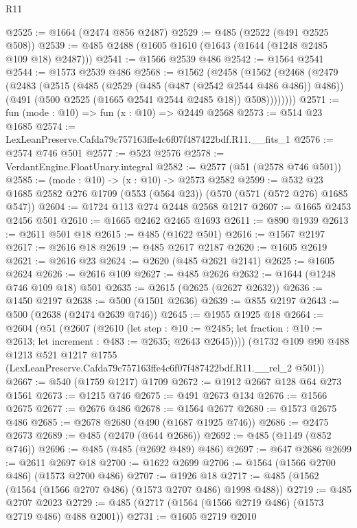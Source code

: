 \begin{lexlean}{R11}
\begin{coremodule}
@2525 := @1664 (@2474 @856 @2487)
@2529 := @485 (@2522 (@491 @2525 @508))
@2539 := @485 @2488 (@1605 @1610 (@1643 (@1644 (@1248 @2485 @109 @18) @2487)))
@2541 := @1566 @2539 @486
@2542 := @1564 @2541
@2544 := @1573 @2539 @486
@2568 := @1562
    (@2458
      (@1562
        (@2468
          (@2479
            (@2483
              (@2515
                (@485
                  (@2529 (@485 (@487 (@2542 @2544 @486 @486)) @486))
                  (@491 (@500 @2525 (@1665 @2541 @2544 @2485 @18)) @508))))))))
@2571 := fun (mode : @10) => fun (x : @10) => @2449 @2568
@2573 := @514 @23 @1685
@2574 := LexLeanPreserve.Cafda79c757163ffe4c6f07f487422bdf.R11.__fits_1
@2576 := @2574 @746 @501
@2577 := @523 @2576
@2578 := VerdantEngine.FloatUnary.integral
@2582 := @2577 (@51 (@2578 @746 @501))
@2585 := (mode : @10) -> (x : @10) -> @2573 @2582
@2599 := @532 @23 @1685 @2582 @276 @1709 (@553 (@564 @23)) (@570 (@571 (@572 @276) @1685 @547))
@2604 := @1724 @113 @274 @2448 @2568 @1217
@2607 := @1665 @2453 @2456 @501
@2610 := @1665 @2462 @2465 @1693
@2611 := @890 @1939
@2613 := @2611 @501 @18
@2615 := @485 (@1622 @501)
@2616 := @1567 @2197
@2617 := @2616 @18
@2619 := @485 @2617 @2187
@2620 := @1605 @2619
@2621 := @2616 @23
@2624 := @2620 (@485 @2621 @2141)
@2625 := @1605 @2624
@2626 := @2616 @109
@2627 := @485 @2626
@2632 := @1644 (@1248 @746 @109 @18) @501
@2635 := @2615 (@2625 (@2627 @2632))
@2636 := @1450 @2197
@2638 := @500 (@1501 @2636)
@2639 := @855 @2197
@2643 := @500 (@2638 (@2474 @2639 @746))
@2645 := @1955 @1925 @18
@2664 := @2604
    (@51
      (@2607
        (@2610
          (let step : @10 := @2485;
          let fraction : @10 := @2613; let increment : @483 := @2635; @2643 @2645))))
    (@1732
      @109
      @90
      @488
      @1213
      @521
      @1217
      @1755
      (LexLeanPreserve.Cafda79c757163ffe4c6f07f487422bdf.R11.__rel_2 @501))
@2667 := @540 (@1759 @1217) @1709
@2672 := @1912 @2667 @128 @64 @273 @1561
@2673 := @1215 @746
@2675 := @491 @2673 @134
@2676 := @1566 @2675
@2677 := @2676 @486
@2678 := @1564 @2677
@2680 := @1573 @2675 @486
@2685 := @2678 @2680 (@490 (@1687 @1925 @746))
@2686 := @2475 @2673
@2689 := @485 (@2470 (@644 @2686))
@2692 := @485 (@1149 (@852 @746))
@2696 := @485 (@485 (@2692 @489) @486)
@2697 := @647 @2686
@2699 := @2611 @2697 @18
@2700 := @1622 @2699
@2706 := @1564 (@1566 @2700 @486) (@1573 @2700 @486)
@2707 := @1926 @18
@2717 := @485 (@1562 (@1564 (@1566 @2707 @486) (@1573 @2707 @486) @1998 @488))
@2719 := @485 @2707 @2023
@2729 := @485 (@2717 (@1564 (@1566 @2719 @486) (@1573 @2719 @486) @488 @2001))
@2731 := @1605 @2719 @2010

\end{coremodule}
\end{lexlean}
